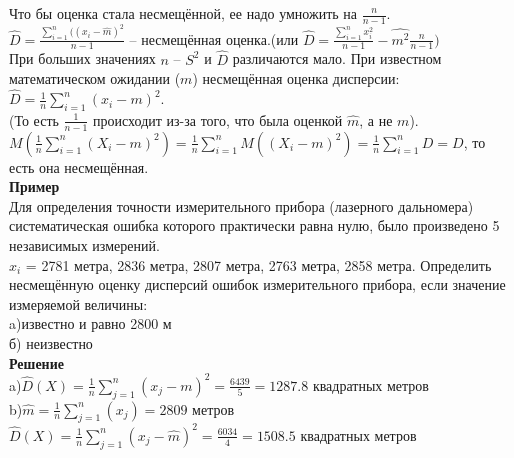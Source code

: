 \documentclass[russian, 12pt, fleqn]{article}
\begin{document}
Что бы оценка стала несмещённой, ее надо умножить на $\frac{n}{n - 1}$.\\
$\hat{D} = \frac{\displaystyle{\sum \limits _{i = 1}^{n}( (x_i - \hat{m})^2 }}{n - 1}$ -- несмещённая оценка.(или $\hat{D} = \frac{\displaystyle{\sum \limits _{i = 1}^{n} x_i^2}}{n - 1} - \hat{m^2} \frac{n}{n - 1})$\\
При больших значениях $n$ -- $S^2$ и $\hat{D}$ различаются мало. При известном математическом ожидании ($m$) несмещённая оценка дисперсии:$\hat{D} = \frac{1}{n} \displaystyle{\sum \limits_{i=1}^{n}(x_i - m)^2}$.\\ (То есть $\frac{1}{n - 1}$ происходит из-за того, что была оценкой $\hat{m}$, а не $m$).\\
$M(\frac{1}{n} \displaystyle{\sum \limits_{i = 1}^{n}} (X_i - m)^2) = \frac{1}{n} \displaystyle{\sum \limits_{i = 1}^{n}} M((X_i - m)^2) = \frac{1}{n}\displaystyle{\sum \limits_{i = 1}^{n}}  D = D$, то есть она несмещённая.\\
\textbf{Пример}\\
Для определения точности измерительного прибора (лазерного дальномера) систематическая ошибка которого практически равна нулю, было произведено 5 независимых измерений.\\
$x_i$  = 2781 метра, 2836 метра, 2807 метра, 2763 метра, 2858 метра. Определить несмещённую оценку дисперсий ошибок  измерительного прибора, если значение измеряемой величины:\\
a)известно и равно 2800 м\\
б) неизвестно\\
\textbf{Решение}\\
a)$\hat{D}(X) = \frac{1}{n} \displaystyle{\sum \limits_{j = 1}^{n}}(x_j - m)^2 = \frac{6439}{5} = 1287.8$ квадратных метров\\
b)$\hat{m} = \frac{1}{n} \displaystyle{\sum \limits_{j = 1}^{n}}(x_j)= 2809$  метров\\
$\hat{D}(X) = \frac{1}{n} \displaystyle{\sum \limits_{j = 1}^{n}}(x_j - \hat{m})^2 = \frac{6034}{4} = 1508.5$ квадратных метров\\
\end{document}
